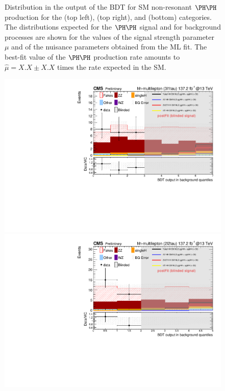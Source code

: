 \begin{figure}
  \caption{
    Distribution in the output of the BDT for SM non-resonant $\HH$ production
    for the \llss (top left), \lllnot (top right), and \llll (bottom) categories.
    The distributions expected for the $\HH$ signal and for background processes
    are shown for the values of the signal strength parameter $\mu$ 
    and of the nuisance parameters obtained from the ML fit.
    The best-fit value of the $\HH$ production rate amounts to $\hat{\mu} = X.X \pm X.X$ 
    times the rate expected in the SM.
  }
  \label{fig:postfitPlots1}
\end{figure}

\begin{figure}
  \centering\includegraphics[width=\cmsFigWidth]{figures/postFitPlots/3l_1tau.pdf}
  \centering\includegraphics[width=\cmsFigWidth]{figures/postFitPlots/2l_2tau.pdf}

\end{figure}
